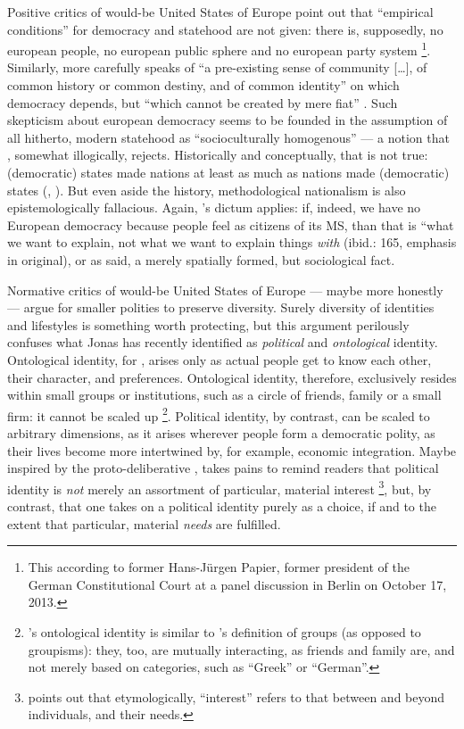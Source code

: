 \documentclass[11pt,a4paper,oneside,openright]{article}
\begin{document}
Positive critics of would-be United States of Europe point out that ``empirical conditions'' for democracy and statehood are not given: 
there is, supposedly, no european people, no european public sphere and no european party system
\footnote{
	This according to former Hans-J\"{u}rgen Papier, former president of the German Constitutional Court at a panel discussion in Berlin on October 17, 2013.
}.
Similarly, \citeauthor{Scharpf1997} more carefully 	speaks of ``a pre-existing sense of community [\ldots], of common history or common destiny, and of common identity'' on which democracy depends, but ``which cannot be created by mere fiat'' \citeyearpar[20]{Scharpf1997}.
Such skepticism about european democracy seems to be founded in the assumption of all hitherto, modern statehood as ``socioculturally homogenous'' \citep[e.g.][93]{BeckGrande-2007-aa} --- a notion that \cite[20]{Scharpf1997}, somewhat illogically, rejects. 
Historically and conceptually, that is not true: 
(democratic) states made nations at least as much as nations made (democratic) states (\citealt{Gellner-1983-aa}, \citealt[recently][934]{Schmitter1999}). 
But even aside the history, methodological nationalism is also epistemologically fallacious. 
Again, \citeauthor{Brubaker-2002-aa}'s dictum applies: 
if, indeed, we have no European democracy because people feel as citizens of its \gls{MS}, than that is ``what we want to explain, not what we want to explain things \emph{with} (ibid.: 165, emphasis in original), or as \citeauthor{Simmel1903} said, a merely spatially formed, but sociological fact.

Normative critics of would-be United States of Europe --- maybe more honestly --- argue for smaller polities to preserve diversity. 
Surely diversity of identities and lifestyles is something worth protecting, but this argument perilously confuses what Jonas \cite{Marx2012} has recently identified as \emph{political} and \emph{ontological} identity. 
Ontological identity, for \citeauthor{Marx2012}, arises only as actual people get to know each other, their character, and preferences. 
Ontological identity, therefore, exclusively resides within small groups or institutions, such as a circle of friends, family or a small firm: 
it cannot be scaled up
\footnote{
	\cite{Marx2012}'s ontological identity is similar to \cite{Brubaker-2002-aa}'s definition of groups (as opposed to groupisms):
	they, too, are mutually interacting, as friends and family are, and not merely based on categories, such as ``Greek'' or ``German''.
}.
Political identity, by contrast, can be scaled to arbitrary dimensions, as it arises wherever people form a democratic polity, as their lives become more intertwined by, for example, economic integration. 
Maybe inspired by the proto-deliberative \cite{Ahrendt1958}, \citeauthor{Marx2012} takes pains to remind readers that political identity is \emph{not} merely an assortment of particular, material interest
\footnote{
	\citeauthor{Marx2012} points out that etymologically, ``interest'' refers to that between and beyond individuals, and their needs.
}, 
but, by contrast, that one takes on a political identity purely as a choice, if and to the extent that particular, material \emph{needs} are fulfilled. 
\end{document}
